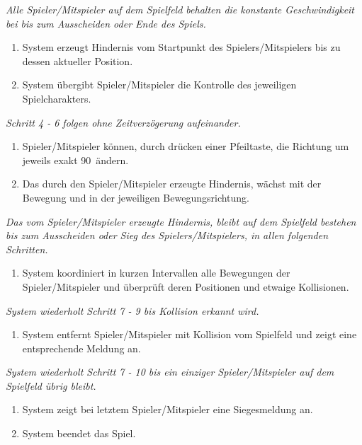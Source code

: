 \documentclass[11pt,ngerman]{article}
\begin{document}
\begin{tcolorbox}
\begin{enumerate}
                \end{enumerate}
                \textit{Alle Spieler/Mitspieler auf dem Spielfeld behalten die konstante Geschwindigkeit bei bis zum Ausscheiden oder Ende des Spiels.}
                \begin{enumerate}[resume]
                    \item System erzeugt Hindernis vom Startpunkt des Spielers/Mitspielers bis zu dessen aktueller Position.
                    \item System übergibt Spieler/Mitspieler die Kontrolle des jeweiligen Spielcharakters.
                \end{enumerate}
                \textit{Schritt 4 - 6 folgen ohne Zeitverzögerung aufeinander.}
                \begin{enumerate}[resume]
                    \item Spieler/Mitspieler können, durch drücken einer Pfeiltaste, die Richtung um jeweils exakt 90\textdegree\ ändern.
                    \item Das durch den Spieler/Mitspieler erzeugte Hindernis, wächst mit der Bewegung und in der jeweiligen Bewegungsrichtung.
                \end{enumerate}
                \textit{Das vom Spieler/Mitspieler erzeugte Hindernis, bleibt auf dem Spielfeld bestehen bis zum Ausscheiden oder Sieg des Spielers/Mitspielers, in allen folgenden Schritten.}
                \begin{enumerate}[resume]
                    \item System koordiniert in kurzen Intervallen alle Bewegungen der Spieler/Mitspieler und überprüft deren Positionen und etwaige Kollisionen.
                \end{enumerate}
                \textit{System wiederholt Schritt 7 - 9 bis Kollision erkannt wird.}
                \begin{enumerate}[resume]
                    \item System entfernt Spieler/Mitspieler mit Kollision vom Spielfeld und zeigt eine entsprechende Meldung an.
                \end{enumerate}
                \textit{System wiederholt Schritt 7 - 10 bis ein einziger Spieler/Mitspieler auf dem Spielfeld übrig bleibt.}
                \begin{enumerate}[resume]
                    \item System zeigt bei letztem Spieler/Mitspieler eine Siegesmeldung an.
                    \item System beendet das Spiel.

\end{enumerate}
\end{tcolorbox}
\end{document}
